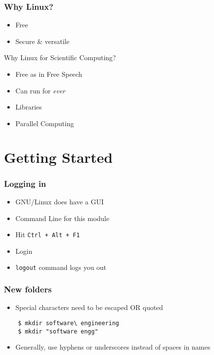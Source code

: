 \documentclass[12pt,compress]{beamer}
\begin{document}
\begin{frame}[fragile]
  \frametitle{Why Linux?}
    \begin{itemize}
    \item Free 
    \item Secure \& versatile
    \end{itemize}

    \begin{block}{Why Linux for Scientific Computing?}
      \begin{itemize}
        \item Free as in Free Speech
        \item Can run for \emph{ever}
        \item Libraries
        \item Parallel Computing
      \end{itemize}
    \end{block}
\end{frame}

\section{Getting Started} 
\begin{frame}[fragile]
  \frametitle{Logging in}
  \begin{itemize}
  \item GNU/Linux does have a GUI
  \item Command Line for this module
  \item Hit \texttt{Ctrl + Alt + F1}
  \item Login 
  \item \texttt{logout} command logs you out
  \end{itemize}
\end{frame}

\begin{frame}[fragile]
  \frametitle{New folders}
  \begin{itemize}
  \item Special characters need to be escaped OR quoted
  \end{itemize}
  \begin{lstlisting}
    $ mkdir software\ engineering
    $ mkdir "software engg"
  \end{lstlisting} 
  \begin{itemize}
  \item Generally, use hyphens or underscores instead of spaces in names
  \end{itemize}
\end{frame}
\end{document}
